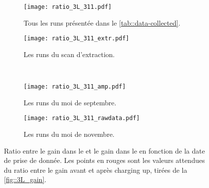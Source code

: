       \begin{figure}[htbp]
        \centering
        \begin{subfigure}[t]{0.5\textwidth}
          \centering
          \texttt{[image: ratio\_3L\_311.pdf]}
        \caption[]{\label{fig::ratio_3L_311_all}Tous les runs présentée dans le \autoref{tab::data-collected}.}
        \end{subfigure}\hfill
        \begin{subfigure}[t]{0.5\textwidth}
          \centering
          \texttt{[image: ratio\_3L\_311\_extr.pdf]}
          \caption[]{\label{fig::ratio_3L_311_extr}Les runs du scan d'extraction.}
        \end{subfigure}\\
        \begin{subfigure}[t]{0.5\textwidth}
          \centering
          \texttt{[image: ratio\_3L\_311\_amp.pdf]}
          \caption[]{\label{fig::ratio_3L_311_ampli}Les runs du moi de septembre.}
        \end{subfigure}\hfill
        \begin{subfigure}[t]{0.5\textwidth}
          \centering
          \texttt{[image: ratio\_3L\_311\_rawdata.pdf]}
          \caption[]{\label{fig::ratio_3L_311_rawdata}Les runs du moi de novembre.}
        \end{subfigure}
        \caption[Ratio entre le gain dans le \threeL{} et le gain dans le \TOO{} en fonction de la date de prise de donnée]{\label{fig::ratio_3L_311}Ratio entre le gain dans le \threeL{} et le gain dans le \TOO{} en fonction de la date de prise de donnée. Les points en rouges sont les valeurs attendues du ratio entre le gain avant et après charging up, tirées de la \autoref{fig::3L_gain}.}
      \end{figure}


